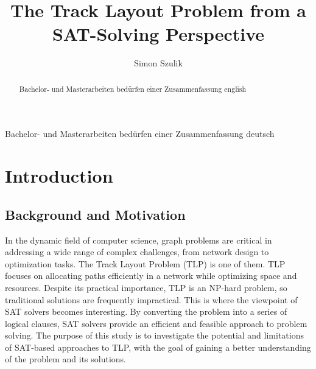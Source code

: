 \documentclass[bachelor, english]{algothesis}
\title{The Track Layout Problem from a SAT-Solving Perspective} %
\author{Simon Szulik} %
\begin{document}
\begin{abstract}
	Bachelor- und Masterarbeiten bedürfen einer Zusammenfassung english
\end{abstract}

\begin{germanabstract}
	Bachelor- und Masterarbeiten bedürfen einer Zusammenfassung deutsch
\end{germanabstract}

\thesistableofcontents

\chapter{Introduction}

\section{Background and Motivation}
In the dynamic field of computer science, graph problems are critical in addressing a wide range of complex challenges, from network design to optimization tasks. The Track Layout Problem (TLP) is one of them. TLP focuses on allocating paths efficiently in a network while optimizing space and resources. Despite its practical importance, TLP is an NP-hard problem, so traditional solutions are frequently impractical. This is where the viewpoint of SAT solvers becomes interesting. By converting the problem into a series of logical clauses, SAT solvers provide an efficient and feasible approach to problem solving. The purpose of this study is to investigate the potential and limitations of SAT-based approaches to TLP, with the goal of gaining a better understanding of the problem and its solutions.
\end{document}
